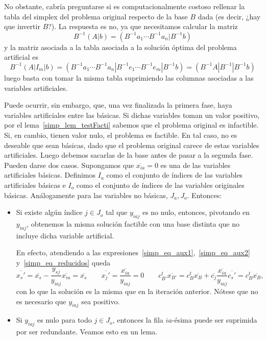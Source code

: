 No obstante, cabría preguntarse si es computacionalmente costoso rellenar la tabla del simplex del problema original respecto de la base $B$ dada (es decir, ¿hay que invertir $B$?). La respuesta es no, ya que necesitamos calcular la matriz
\begin{equation*}
	B^{-1}(A|b)=(B^{-1}a_1\cdots B^{-1}a_n|B^{-1}b)
\end{equation*}
y la matriz asociada a la tabla asociada a la solución óptima del problema artificial es
\begin{equation*}
	B^{-1}(A|I_m|b)=(B^{-1}a_1\cdots B^{-1}a_n|B^{-1}e_1\cdots B^{-1}e_m|B^{-1}b)=(B^{-1}A|B^{-1}|B^{-1}b)
\end{equation*}
luego basta con tomar la misma tabla suprimiendo las columnas asociadas a las variables artificiales.

Puede ocurrir, sin embargo, que, una vez finalizada la primera fase, haya variables artificiales entre las básicas. Si dichas variables toman un valor positivo, por el lema~\ref{simp_lem_testFacti} sabemos que el problema original es infactible. Si, en cambio, tienen valor nulo, el problema es factible. En tal caso, no es deseable que sean básicas, dado que el problema original carece de estas variables artificiales. Luego debemos sacarlas de la base antes de pasar a la segunda fase. Pueden darse dos casos. Supongamos que $\overline{x_{ia}}=0$ es una de las variables artificiales básicas. Definimos $I_a$ como el conjunto de índices de las variables artificiales básicas e $I_o$ como el conjunto de índices de las variables originales básicas. Análogamente para las variables no básicas, $J_a, J_o$. Entonces:
\begin{itemize}
	\item Si existe algún índice $j\in J_o$ tal que $y_{iaj}$ es no nulo, entonces, pivotando en $y_{iaj}$, obtenemos la misma solución factible con una base distinta que no incluye dicha variable artificial.
	
	En efecto, atendiendo a las expresiones~\eqref{simp_eq_aux1},~\eqref{simp_eq_aux2} y~\eqref{simp_eq_reducidos} queda
	\begin{equation}
		\overline{x_s'}=\overline{x_s}-\frac{y_{sj}}{y_{iaj}}\overline{x_{ia}}=\overline{x_s} \qquad \overline{x_j'}=\frac{\overline{x_{ia}}}{y_{iaj}}=0 \qquad c^t_{B'}\overline{x_{B'}}=c^t_B\overline{x_B}+\overline{c_j}\frac{\overline{x_{ia}}}{y_{iaj}}\overline{c_s'}=c^t_B\overline{x_B},
	\end{equation}
	con lo que la solución es la misma que en la iteración anterior. Nótese que no es necesario que $y_{iaj}$ sea positivo.
	
	\item Si $y_{iaj}$ es nulo para todo $j\in J_o$, entonces la fila $ia$-ésima puede ser suprimida por ser redundante. Veamos esto en un lema.
\end{itemize}
